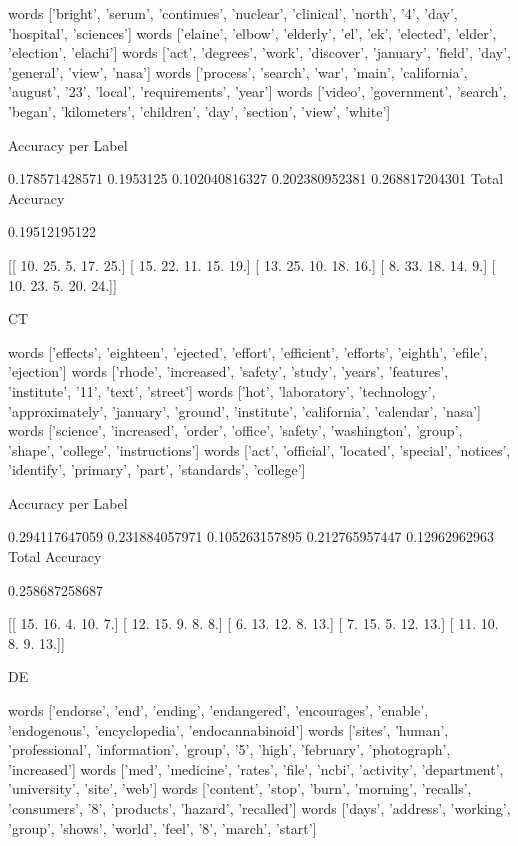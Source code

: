 \documentclass[11pt]{article}
\begin{document}
\begin{verbatium}
words
['bright', 'serum', 'continues', 'nuclear', 'clinical', 'north', '4', 'day', 'hospital', 'sciences']
words
['elaine', 'elbow', 'elderly', 'el', 'ek', 'elected', 'elder', 'election', 'elachi']
words
['act', 'degrees', 'work', 'discover', 'january', 'field', 'day', 'general', 'view', 'nasa']
words
['process', 'search', 'war', 'main', 'california', 'august', '23', 'local', 'requirements', 'year']
words
['video', 'government', 'search', 'began', 'kilometers', 'children', 'day', 'section', 'view', 'white']

Accuracy per Label

0.178571428571
0.1953125
0.102040816327
0.202380952381
0.268817204301
Total Accuracy

0.19512195122


[[ 10.  25.   5.  17.  25.]
 [ 15.  22.  11.  15.  19.]
 [ 13.  25.  10.  18.  16.]
 [  8.  33.  18.  14.   9.]
 [ 10.  23.   5.  20.  24.]]


CT


words
['effects', 'eighteen', 'ejected', 'effort', 'efficient', 'efforts', 'eighth', 'efile', 'ejection']
words
['rhode', 'increased', 'safety', 'study', 'years', 'features', 'institute', '11', 'text', 'street']
words
['hot', 'laboratory', 'technology', 'approximately', 'january', 'ground', 'institute', 'california', 'calendar', 'nasa']
words
['science', 'increased', 'order', 'office', 'safety', 'washington', 'group', 'shape', 'college', 'instructions']
words
['act', 'official', 'located', 'special', 'notices', 'identify', 'primary', 'part', 'standards', 'college']

Accuracy per Label

0.294117647059
0.231884057971
0.105263157895
0.212765957447
0.12962962963
Total Accuracy

0.258687258687


[[ 15.  16.   4.  10.   7.]
 [ 12.  15.   9.   8.   8.]
 [  6.  13.  12.   8.  13.]
 [  7.  15.   5.  12.  13.]
 [ 11.  10.   8.   9.  13.]]


DE


words
['endorse', 'end', 'ending', 'endangered', 'encourages', 'enable', 'endogenous', 'encyclopedia', 'endocannabinoid']
words
['sites', 'human', 'professional', 'information', 'group', '5', 'high', 'february', 'photograph', 'increased']
words
['med', 'medicine', 'rates', 'file', 'ncbi', 'activity', 'department', 'university', 'site', 'web']
words
['content', 'stop', 'burn', 'morning', 'recalls', 'consumers', '8', 'products', 'hazard', 'recalled']
words
['days', 'address', 'working', 'group', 'shows', 'world', 'feel', '8', 'march', 'start']


\end{verbatium}
\end{document}
